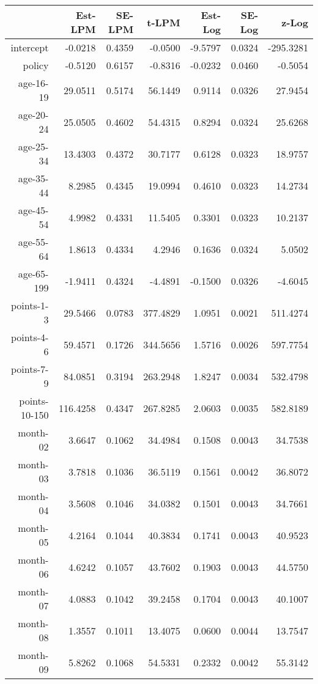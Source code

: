 \documentclass[10pt]{article}
\begin{document}
\begin{table}[ht]
\centering
\begin{tabular}{rrrrrrr}
  \hline
 & Est-LPM & SE-LPM & t-LPM & Est-Log & SE-Log & z-Log \\ 
  \hline
intercept & -0.0218 & 0.4359 & -0.0500 & -9.5797 & 0.0324 & -295.3281 \\ 
  policy & -0.5120 & 0.6157 & -0.8316 & -0.0232 & 0.0460 & -0.5054 \\ 
  age-16-19 & 29.0511 & 0.5174 & 56.1449 & 0.9114 & 0.0326 & 27.9454 \\ 
  age-20-24 & 25.0505 & 0.4602 & 54.4315 & 0.8294 & 0.0324 & 25.6268 \\ 
  age-25-34 & 13.4303 & 0.4372 & 30.7177 & 0.6128 & 0.0323 & 18.9757 \\ 
  age-35-44 & 8.2985 & 0.4345 & 19.0994 & 0.4610 & 0.0323 & 14.2734 \\ 
  age-45-54 & 4.9982 & 0.4331 & 11.5405 & 0.3301 & 0.0323 & 10.2137 \\ 
  age-55-64 & 1.8613 & 0.4334 & 4.2946 & 0.1636 & 0.0324 & 5.0502 \\ 
  age-65-199 & -1.9411 & 0.4324 & -4.4891 & -0.1500 & 0.0326 & -4.6045 \\ 
  points-1-3 & 29.5466 & 0.0783 & 377.4829 & 1.0951 & 0.0021 & 511.4274 \\ 
  points-4-6 & 59.4571 & 0.1726 & 344.5656 & 1.5716 & 0.0026 & 597.7754 \\ 
  points-7-9 & 84.0851 & 0.3194 & 263.2948 & 1.8247 & 0.0034 & 532.4798 \\ 
  points-10-150 & 116.4258 & 0.4347 & 267.8285 & 2.0603 & 0.0035 & 582.8189 \\ 
  month-02 & 3.6647 & 0.1062 & 34.4984 & 0.1508 & 0.0043 & 34.7538 \\ 
  month-03 & 3.7818 & 0.1036 & 36.5119 & 0.1561 & 0.0042 & 36.8072 \\ 
  month-04 & 3.5608 & 0.1046 & 34.0382 & 0.1501 & 0.0043 & 34.7661 \\ 
  month-05 & 4.2164 & 0.1044 & 40.3834 & 0.1741 & 0.0043 & 40.9523 \\ 
  month-06 & 4.6242 & 0.1057 & 43.7602 & 0.1903 & 0.0043 & 44.5750 \\ 
  month-07 & 4.0883 & 0.1042 & 39.2458 & 0.1704 & 0.0043 & 40.1007 \\ 
  month-08 & 1.3557 & 0.1011 & 13.4075 & 0.0600 & 0.0044 & 13.7547 \\ 
  month-09 & 5.8262 & 0.1068 & 54.5331 & 0.2332 & 0.0042 & 55.3142 \\ 

\end{tabular}
\end{table}
\end{document}
